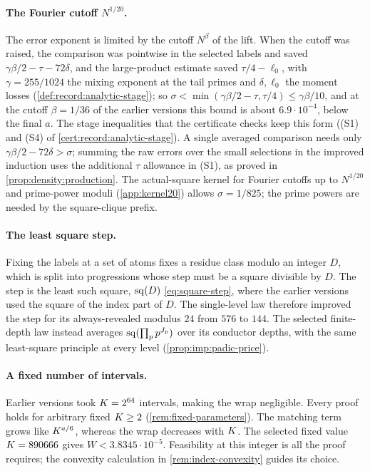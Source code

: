 \paragraph{The Fourier cutoff $N^{1/20}$.}
The error exponent is limited by the cutoff $N^\beta$ of the lift. When the
cutoff was raised, the comparison was pointwise in the selected labels and
saved $\gamma\beta/2-\tau-72\delta$, and the large-product estimate saved
$\tau/4-\ell_0$, with $\gamma=255/1024$ the mixing exponent at the tail primes
and $\delta,\ell_0$ the moment losses (\cref{def:record:analytic-stage}); so
$\sigma<\min(\gamma\beta/2-\tau,\tau/4)\le\gamma\beta/10$, and at the cutoff
$\beta=1/36$ of the earlier versions this bound is about $6.9\cdot10^{-4}$,
below the final $a$. The stage inequalities that the certificate checks keep
this form ((S1) and (S4) of \cref{cert:record:analytic-stage}). A single
averaged comparison needs only $\gamma\beta/2-72\delta>\sigma$;
summing the raw errors over the small selections in the improved
induction uses the additional $\tau$ allowance in (S1), as proved in
\cref{prop:density:production}. The
actual-square kernel for Fourier cutoffs up to $N^{1/20}$ and prime-power
moduli (\cref{app:kernel20}) allows $\sigma=1/825$; the prime powers are needed
by the square-clique prefix.

\paragraph{The least square step.}
Fixing the labels at a set of atoms fixes a residue class modulo an integer
$D$, which is split into progressions whose step must be a square divisible by
$D$. The step is the least such square, $\operatorname{sq}(D)$ \eqref{eq:square-step}, where
the earlier versions used the square of the index part of $D$. The
single-level law therefore improved the step for its always-revealed modulus
$24$ from $576$ to $144$. The selected finite-depth law instead averages
$\operatorname{sq}(\prod_p p^{J_p})$ over its conductor depths, with the same least-square
principle at every level (\cref{prop:imp:padic-price}).

\paragraph{A fixed number of intervals.}
Earlier versions took $K=2^{64}$ intervals, making the wrap negligible.
Every proof holds for arbitrary fixed $K\ge2$
(\cref{rem:fixed-parameters}). The matching term grows like $K^{a/6}$,
whereas the wrap decreases with $K$. The selected fixed value
$K=890666$ gives $W<3.8345\cdot10^{-5}$. Feasibility at this integer is
all the proof requires; the convexity calculation in
\cref{rem:index-convexity} guides its choice.

